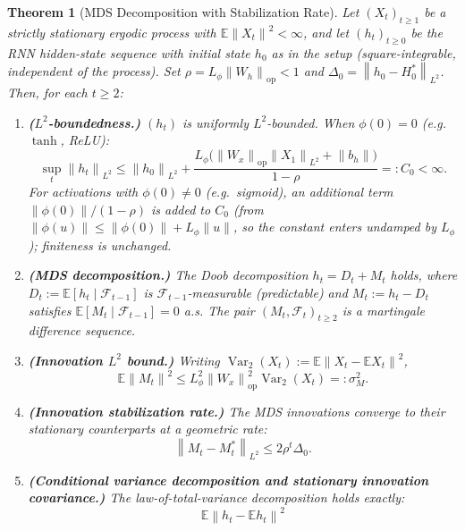 \documentclass[bj,authoryear]{imsart}
\theoremstyle{plain}
\newtheorem{theorem}{Theorem}[section]
\theoremstyle{definition}
\newcommand{\E}{\mathbb{E}}
\newcommand{\F}{\mathcal{F}}
\newcommand{\norm}[1]{\left\lVert #1 \right\rVert}
\newcommand{\given}{\mid}
\DeclareMathOperator{\Var}{Var}
\begin{document}
\begin{theorem}[MDS Decomposition with Stabilization Rate]
\label{thm:mds}
  Let $(X_t)_{t\geq 1}$ be a strictly stationary ergodic process with
  $\E\norm{X_t}^2<\infty$, and let $(h_t)_{t\geq 0}$ be the RNN
  hidden-state sequence with initial state $h_0$ as in the setup
  (square-integrable, independent of the process).
  Set $\rho=L_\phi\norm{W_h}_{\mathrm{op}}<1$ and
  $\Delta_0=\norm{h_0-H_0^*}_{L^2}$.  Then, for each $t\geq 2$:
  \begin{enumerate}[label=(\roman*), itemsep=3pt]
    \item \textbf{($L^2$-boundedness.)}
      $(h_t)$ is uniformly $L^2$-bounded.  When $\phi(0)=0$ (e.g.\ $\tanh$, ReLU):
      \[
        \sup_t\norm{h_t}_{L^2}
        \leq \norm{h_0}_{L^2}
          +\frac{L_\phi\bigl(\norm{W_x}_{\mathrm{op}}\norm{X_1}_{L^2}
                  +\norm{b_h}\bigr)}{1-\rho}
        =: C_0 < \infty.
      \]
      For activations with $\phi(0)\neq 0$ (e.g.\ sigmoid), an additional term $\|\phi(0)\|/(1-\rho)$ is added to $C_0$ (from $\|\phi(u)\|\leq\|\phi(0)\|+L_\phi\|u\|$, so the constant enters undamped by $L_\phi$); finiteness is unchanged.
    \item \textbf{(MDS decomposition.)}
      The Doob decomposition $h_t=D_t+M_t$ holds, where
      $D_t:=\E[h_t\given\F_{t-1}]$ is $\F_{t-1}$-measurable (predictable)
      and $M_t:=h_t-D_t$ satisfies $\E[M_t\given\F_{t-1}]=0$ a.s.
      The pair $(M_t,\F_t)_{t\geq 2}$ is a martingale difference sequence.
    \item \textbf{(Innovation $L^2$ bound.)}
      Writing $\Var_2(X_t):=\E\norm{X_t-\E X_t}^2$,
      \begin{equation}
        \E\norm{M_t}^2
        \leq L_\phi^2\norm{W_x}_{\mathrm{op}}^2\Var_2(X_t)
        =: \sigma_M^2.
        \label{eq:Mbound}
      \end{equation}
    \item \textbf{(Innovation stabilization rate.)}
      The MDS innovations converge to their stationary counterparts
      at a geometric rate:
      \begin{equation}
        \norm{M_t-M_t^*}_{L^2} \leq 2\rho^t\Delta_0.
        \label{eq:Mstab}
      \end{equation}
    \item \textbf{(Conditional variance decomposition and stationary
          innovation covariance.)}
      The law-of-total-variance decomposition holds exactly:
      \begin{equation}
        \E\norm{h_t-\E h_t}^2

\end{equation}
\end{enumerate}
\end{theorem}
\end{document}
